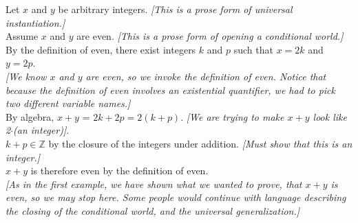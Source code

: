 \documentclass[10pt]{article}
\newcommand{\Z}{\mathbb{Z}}
\begin{document}
Let $x$ and $y$ be arbitrary integers. \hfill \textit{[This is a prose form of universal instantiation.]}\\

Assume $x$ and $y$ are even. \hfill \textit{[This is a prose form of opening a conditional world.]}\\

By the definition of even, there exist integers $k$ and $p$ such that $x=2k$ and $y=2p$.\\

 \textit{[We know $x$ and $y$ are even, so we invoke the definition of even.  Notice that because the definition of even involves an existential quantifier,
we had to pick two different variable names.]}\\

By algebra, $x+y$ = $2k+2p = 2(k+p)$. \hfill \textit{[We are trying to make $x+y$ look like 2$\cdot$(an integer)]}.\\

$k+p \in \Z$ by the closure of the integers under addition. \hfill \textit{[Must show that this is an integer.]}\\

$x+y$ is therefore even by the definition of even.\\

\textit{[As in the first example, we have shown what we wanted to prove, that $x+y$ is even, so we may stop here.  Some people would continue with 
language describing the closing of the conditional world, and the universal generalization.]}\\
\end{document}

